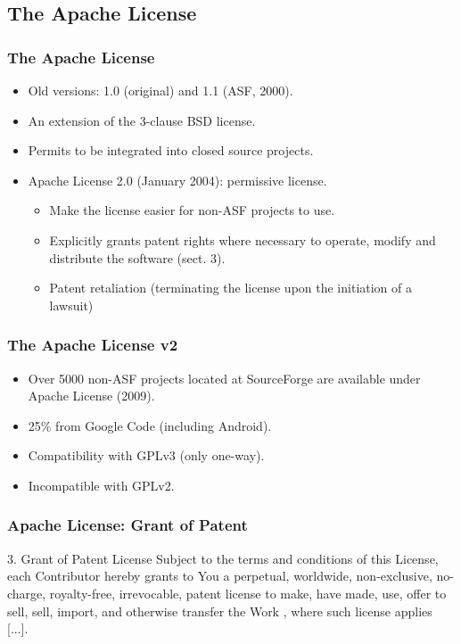 \documentclass{beamer}
\begin{document}
\subsection{The Apache License}
\begin{frame}
\frametitle{The Apache License}

\begin{itemize}
\item Old versions: 1.0 (original) and 1.1 (ASF, 2000).
\item An extension of the 3-clause BSD license.
	\item Permits to be integrated into closed source projects.
\item \alert{Apache License 2.0} (January 2004): permissive license.
	\begin{itemize}
	\item Make the license easier for non-ASF projects to use.
	\item Explicitly \alert{grants patent rights} where necessary to operate, modify and distribute the 	software (sect. 3).
	\item \alert{Patent retaliation} (terminating the license upon the initiation of a lawsuit)
	\end{itemize}
\end{itemize}

\end{frame}


\begin{frame}
\frametitle{The Apache License v2}

\begin{itemize}
\item Over 5000 non-ASF projects located at SourceForge are available under Apache License (2009). 
\item 25\% from Google Code (including Android).
\item Compatibility with GPLv3 (only one-way). 
\item Incompatible with GPLv2.
\end{itemize}

\end{frame}


\begin{frame}
\frametitle{Apache License: Grant of Patent}

\begin{block}{3. Grant of Patent License}
Subject to the terms and conditions of this License, each Contributor hereby grants to You a perpetual, worldwide, non-exclusive, no-charge, royalty-free, irrevocable, patent license to make, have made, use, offer to sell, sell, import, and otherwise transfer the Work , where such license applies [...].
\end{block}

\end{frame}
\end{document}

